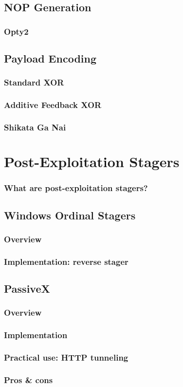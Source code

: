 \documentclass{beamer}
\begin{document}
    \subsection{NOP Generation}
\begin{frame}[t]
    \frametitle{Opty2}
\end{frame}
    \subsection{Payload Encoding}
\begin{frame}[t]
    \frametitle{Standard XOR}
\end{frame}
\begin{frame}[t]
    \frametitle{Additive Feedback XOR}
\end{frame}
\begin{frame}[t]
    \frametitle{Shikata Ga Nai}
\end{frame}

\section{Post-Exploitation Stagers}
\begin{frame}[t]
    \frametitle{What are post-exploitation stagers?}
\end{frame}

    \subsection{Windows Ordinal Stagers}
\begin{frame}[t]
    \frametitle{Overview}
\end{frame}
\begin{frame}[t]
    \frametitle{Implementation: reverse stager}
\end{frame}
    \subsection{PassiveX}
\begin{frame}[t]
    \frametitle{Overview}
\end{frame}
\begin{frame}[t]
    \frametitle{Implementation}
\end{frame}
\begin{frame}[t]
    \frametitle{Practical use: HTTP tunneling}
\end{frame}
\begin{frame}[t]
    \frametitle{Pros \& cons}
\end{frame}
\end{document}
